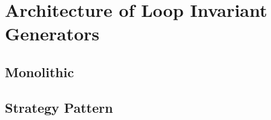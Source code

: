 \section{Architecture of Loop Invariant Generators}

\subsection{Monolithic}

\subsection{Strategy Pattern}
